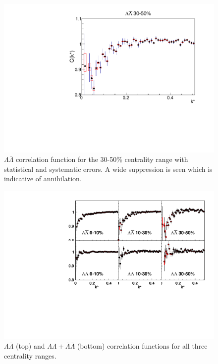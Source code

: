 \begin{figure}[hbt]
\includegraphics[width=36pc]{Figures/CFs/2016-8-30-CFLamALam3050CombinedSystematicsMaximum.pdf}
\caption[$\Lambda\bar{\Lambda}$ correlation function for the 30-50\% centrality range]{$\Lambda\bar{\Lambda}$ correlation function for the 30-50\% centrality range with statistical and systematic errors.  
A wide suppression is seen which is indicative of annihilation.}
\label{fig:CFLamALam3050}
\end{figure}

\begin{figure}[hbt]
\includegraphics[width=36pc]{Figures/CFs/2016-08-30-AllCFsWithSysErrorsNoFit.pdf}
\caption[All $\Lambda\Lambda+\bar{\Lambda}\bar{\Lambda}$ and $\Lambda\bar{\Lambda}$ correlation functions]{$\Lambda\bar{\Lambda}$ (top) and $\Lambda\Lambda+\bar{\Lambda}\bar{\Lambda}$ (bottom) correlation functions for all three centrality ranges.}
\label{fig:CFAllOnOnePlot}
\end{figure}



